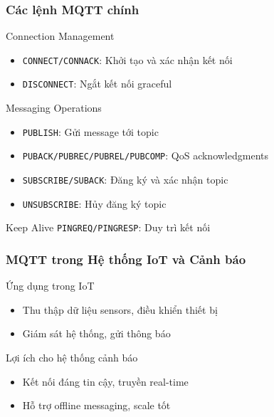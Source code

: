 \begin{frame}
\frametitle{Các lệnh MQTT chính}

\begin{block}{Connection Management}
\begin{itemize}
\item \texttt{CONNECT/CONNACK}: Khởi tạo và xác nhận kết nối
\item \texttt{DISCONNECT}: Ngắt kết nối graceful
\end{itemize}
\end{block}

\begin{block}{Messaging Operations}
\begin{itemize}
\item \texttt{PUBLISH}: Gửi message tới topic
\item \texttt{PUBACK/PUBREC/PUBREL/PUBCOMP}: QoS acknowledgments
\item \texttt{SUBSCRIBE/SUBACK}: Đăng ký và xác nhận topic
\item \texttt{UNSUBSCRIBE}: Hủy đăng ký topic
\end{itemize}
\end{block}

\begin{block}{Keep Alive}
\texttt{PINGREQ/PINGRESP}: Duy trì kết nối
\end{block}

\end{frame}

\begin{frame}
\frametitle{MQTT trong Hệ thống IoT và Cảnh báo}

\begin{block}{Ứng dụng trong IoT}
\begin{itemize}
\item Thu thập dữ liệu sensors, điều khiển thiết bị
\item Giám sát hệ thống, gửi thông báo
\end{itemize}
\end{block}

\begin{block}{Lợi ích cho hệ thống cảnh báo}
\begin{itemize}
\item Kết nối đáng tin cậy, truyền real-time
\item Hỗ trợ offline messaging, scale tốt
\end{itemize}
\end{block}

\end{frame}

